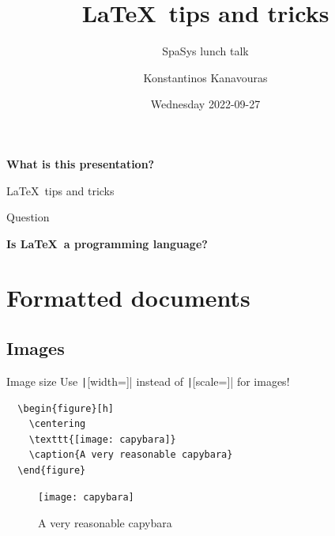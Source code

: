 \documentclass[aspectratio=169]{beamer}
\title{\LaTeX~tips and tricks}
\subtitle{SpaSys lunch talk}
\date{Wednesday 2022-09-27}
\author{Konstantinos Kanavouras}
\institute{University of Luxembourg}
\begin{document}
 \maketitle
	

	

    \begin{frame}
    	\centering
    	
    	\textbf{What is this presentation?}
    	
    	\LaTeX~tips and tricks
    \end{frame}

	{
	\begin{frame}[standout]{Question}
		
		
		\textbf{Is \LaTeX~a programming language?}
	\end{frame}
	}

	\section{Formatted documents}
	
	\subsection{Images}
	
	 \begin{frame}[fragile]{Image size}
		Use \texttt|[width=]| instead of \texttt|[scale=]| for images!
		\vspace{4mm}
		\begin{example}
			\vspace*{2mm}
				\begin{verbatim}
  \begin{figure}[h]
    \centering
    \texttt{[image: capybara]}
    \caption{A very reasonable capybara}
  \end{figure}
				\end{verbatim}
			\vspace{-.5cm}
			  \begin{figure}[H]
				\centering
				\texttt{[image: capybara]}
				\caption{A very reasonable capybara}
				\label{fig:capybara}
			\end{figure}
		\end{example}
	\end{frame}
	
\end{document}
